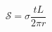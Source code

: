 \begin{equation}
    \mathcal{S} = \sigma \frac{t L}{2 \pi r}
    \label{eq:conductance}
\end{equation}

